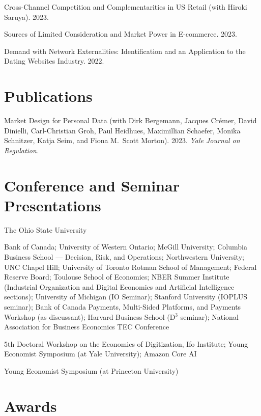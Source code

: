 \documentclass[11pt]{article} %
\begin{document}
\medskip

Cross-Channel Competition and Complementarities in US Retail
(with Hiroki Saruya). 2023.

\medskip

Sources of Limited Consideration and Market Power in E-commerce. 2023.

\medskip


 
Demand with Network Externalities: 
Identification and an Application to the Dating Websites Industry. 2022.




\section*{Publications}

Market Design for Personal Data
(with Dirk Bergemann, Jacques Cr\'{e}mer, David Dinielli, 
Carl-Christian Groh, Paul Heidhues, Maximillian Schaefer, 
Monika Schnitzer, Katja Seim, and Fiona M.\ Scott Morton).
2023. \textit{Yale Journal on Regulation.}




\section*{Conference and Seminar Presentations}

 The Ohio State University

 Bank of Canada; University of Western Ontario;
	McGill University; Columbia Business School --- Decision, Risk, and Operations;
	Northwestern University; UNC Chapel Hill; University of Toronto Rotman School
	of Management; Federal Reserve Board; Toulouse School of Economics;
	NBER Summer Institute (Industrial Organization and Digital Economics and Artificial
	Intelligence sections); University of Michigan (IO Seminar);
	Stanford University (IOPLUS seminar); Bank of Canada Payments, Multi-Sided Platforms, and Payments
	Workshop (as discussant); 
	Harvard Business School (D${}^3$ seminar); 
	National Association for Business Economics TEC Conference


 5th Doctoral Workshop on the Economics of Digitization, Ifo Institute; 
	Young Economist Symposium (at Yale University); Amazon Core AI


 Young Economist Symposium (at Princeton University)

\section*{Awards}
\end{document}
